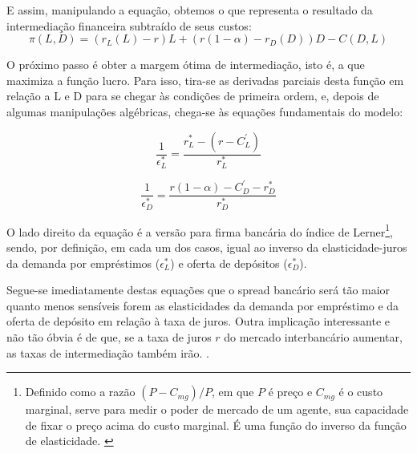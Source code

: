 \documentclass[a4paper, 12pt, openany, oneside, brazil]{abntex2}
\begin{document}
	E assim, manipulando a equação, obtemos o que representa o resultado da intermediação financeira subtraído de seus custos: \begin{equation}\pi(L, D) = (r_L(L) - r)L + (r(1 - \alpha) - r_D(D))D - C(D, L)\end{equation}

O próximo passo é obter a margem ótima de intermediação, isto é, a que maximiza a função lucro. Para isso, tira-se as derivadas parciais desta função em relação a L e D para se chegar às condições de primeira ordem, e, depois de algumas manipulações algébricas, chega-se às equações fundamentais do modelo:

\begin{equation}
\frac{1}{\epsilon^{*}_L} = \frac{r^{*}_L - (r - C^{'}_L)}{r^{*}_L}
\end{equation}

\begin{equation}
\frac{1}{\epsilon^{*}_D} = \frac{r(1-\alpha)-C^{'}_D - r^{*}_D}{r^{*}_D}
\end{equation}

O lado direito da equação é a versão para firma bancária do índice de Lerner\footnote{ Definido como a razão $(P - C_{mg}) / P$, em que $P$ é preço e $C_{mg}$ é o custo marginal, serve para medir o poder de mercado de um agente, sua capacidade de fixar o preço acima do custo marginal. É uma função do inverso da função de elasticidade. \cite{maudos}}, sendo, por definição, em cada um dos casos, igual ao inverso da elasticidade-juros da demanda por empréstimos ($\epsilon^{*}_L$) e oferta de depósitos ($\epsilon^{*}_D$).

Segue-se imediatamente destas equações que o spread bancário será tão maior quanto menos sensíveis forem as elasticidades da demanda por empréstimo e da oferta de depósito em relação à taxa de juros. Outra implicação interessante e não tão óbvia é de que, se a taxa de juros $r$ do mercado interbancário aumentar, as taxas de intermediação também irão. \cite{freixas}.


\end{document}
